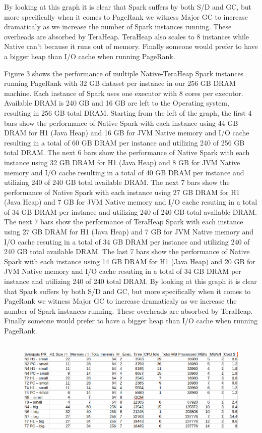 \documentclass[twocolumn,10pt]{asme2e}
\begin{document}
By looking at this graph it is clear that Spark suffers by both S/D and GC, but more specifically when it comes to PageRank we witness Major GC to increase dramaticaly as we increase the number of Spark instances running. These overheads are absorbed by TeraHeap. TeraHeap also scales to 8 instances while Native can't because it runs out of memory. Finally someone would prefer to have a bigger heap than I/O cache when running PageRank.

Figure 3 shows the performance of multiple Native-TeraHeap Spark instances running PageRank with 32 GB dataset per instance in our 256 GB DRAM machine. Each instance of Spark uses one executor with 8 cores per executor. Available DRAM is 240 GB and 16 GB are left to the Operating system, resulting in 256 GB total DRAM. Starting from the left of the graph, the first 4 bars show the performance of Native Spark with each instance using 44 GB DRAM for H1 (Java Heap) and 16 GB for JVM Native memory and I/O cache resulting in a total of 60 GB DRAM per instance and utilizing 240 of 256 GB total DRAM. The next 6 bars show the performance of Native Spark with each instance using 32 GB DRAM for H1 (Java Heap) and 8 GB for JVM Native memory and I/O cache resulting in a total of 40 GB DRAM per instance and utilizing 240 of 240 GB total available DRAM. The next 7 bars show the performance of Native Spark with each instance using 27 GB DRAM for H1 (Java Heap) and 7 GB for JVM Native memory and I/O cache resuting in a total of 34 GB DRAM per instance and utilizing 240 of 240 GB total available DRAM. The next 7 bars show the performance of TeraHeap Spark with each instance using 27 GB DRAM for H1 (Java Heap) and 7 GB for JVM Native memory and I/O cache resuting in a total of 34 GB DRAM per instance and utilizing 240 of 240 GB total available DRAM. The last 7 bars show the performance of Native Spark with each instance using 14 GB DRAM for H1 (Java Heap) and 20 GB for JVM Native memory and I/O cache resuting in a total of 34 GB DRAM per instance and utilizing 240 of 240 total DRAM. By looking at this graph it is clear that Spark suffers by both S/D and GC, but more specifically when it comes to PageRank we witness Major GC to increase dramaticaly as we increase the number of Spark instances running. These overheads are absorbed by TeraHeap.
Finally someone would prefer to have a bigger heap than I/O cache when running PageRank.

\begin{figure}[h!]
        \includegraphics[width=18cm,height=5cm]{pr_table.png}
\end{figure}
\end{document}
